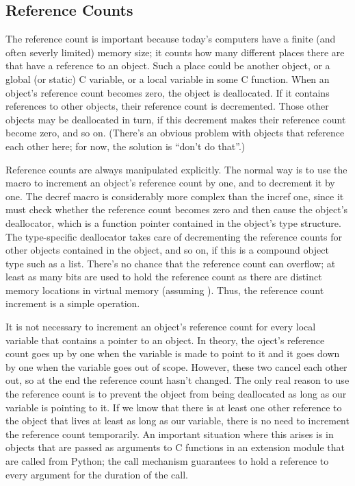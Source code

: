 \subsection{Reference Counts}

The reference count is important because today's computers have a 
finite (and often severly limited) memory size; it counts how many 
different places there are that have a reference to an object.  Such a 
place could be another object, or a global (or static) C variable, or 
a local variable in some C function.  When an object's reference count 
becomes zero, the object is deallocated.  If it contains references to 
other objects, their reference count is decremented.  Those other 
objects may be deallocated in turn, if this decrement makes their 
reference count become zero, and so on.  (There's an obvious problem 
with objects that reference each other here; for now, the solution is 
``don't do that''.)

Reference counts are always manipulated explicitly.  The normal way is 
to use the macro  to increment an object's 
reference count by one, and  to decrement it by 
one.  The decref macro is considerably more complex than the incref one, 
since it must check whether the reference count becomes zero and then 
cause the object's deallocator, which is a function pointer contained 
in the object's type structure.  The type-specific deallocator takes 
care of decrementing the reference counts for other objects contained 
in the object, and so on, if this is a compound object type such as a 
list.  There's no chance that the reference count can overflow; at 
least as many bits are used to hold the reference count as there are 
distinct memory locations in virtual memory (assuming 
).  Thus, the reference count 
increment is a simple operation.

It is not necessary to increment an object's reference count for every 
local variable that contains a pointer to an object.  In theory, the 
oject's reference count goes up by one when the variable is made to 
point to it and it goes down by one when the variable goes out of 
scope.  However, these two cancel each other out, so at the end the 
reference count hasn't changed.  The only real reason to use the 
reference count is to prevent the object from being deallocated as 
long as our variable is pointing to it.  If we know that there is at 
least one other reference to the object that lives at least as long as 
our variable, there is no need to increment the reference count 
temporarily.  An important situation where this arises is in objects 
that are passed as arguments to C functions in an extension module 
that are called from Python; the call mechanism guarantees to hold a 
reference to every argument for the duration of the call.

